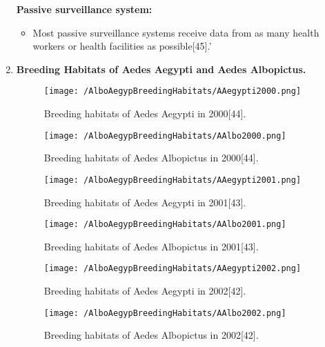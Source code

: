 \documentclass[11pt]{exam}
\begin{document}
\begin{questions}
\begin{enumerate}
\textbf{Passive surveillance system:}\\
\begin{itemize}
\item Most passive surveillance systems receive data from as many health workers or health facilities as possible[45].' 
\end{itemize}

\newpage
\item \textbf{Breeding Habitats of Aedes Aegypti and Aedes Albopictus.}
\begin{figure}[H]
  \centering
   \texttt{[image: /AlboAegypBreedingHabitats/AAegypti2000.png]} 
  \caption{Breeding habitats of Aedes Aegypti in 2000[44].}
   \label{Breeding habitats of Aedes mosquitoes}
\end{figure} 

\begin{figure}[H]
  \centering
   \texttt{[image: /AlboAegypBreedingHabitats/AAlbo2000.png]} 
  \caption{Breeding habitats of Aedes Albopictus in 2000[44].}
   \label{Breeding habitats of Aedes mosquitoes}
\end{figure} 

\newpage
\begin{figure}[H]
  \centering
   \texttt{[image: /AlboAegypBreedingHabitats/AAegypti2001.png]} 
  \caption{Breeding habitats of Aedes Aegypti in 2001[43].}
   \label{Breeding habitats of Aedes mosquitoes}
\end{figure} 

\begin{figure}[H]
  \centering
   \texttt{[image: /AlboAegypBreedingHabitats/AAlbo2001.png]} 
  \caption{Breeding habitats of Aedes Albopictus in 2001[43].}
   \label{Breeding habitats of Aedes mosquitoes}
\end{figure} 

\newpage
\begin{figure}[H]
  \centering
   \texttt{[image: /AlboAegypBreedingHabitats/AAegypti2002.png]} 
  \caption{Breeding habitats of Aedes Aegypti in 2002[42].}
   \label{Breeding habitats of Aedes mosquitoes}
\end{figure} 

\begin{figure}[H]
  \centering
   \texttt{[image: /AlboAegypBreedingHabitats/AAlbo2002.png]} 
  \caption{Breeding habitats of Aedes Albopictus in 2002[42].}
   \label{Breeding habitats of Aedes mosquitoes}
\end{figure} 


\end{enumerate}
\end{questions}
\end{document}

